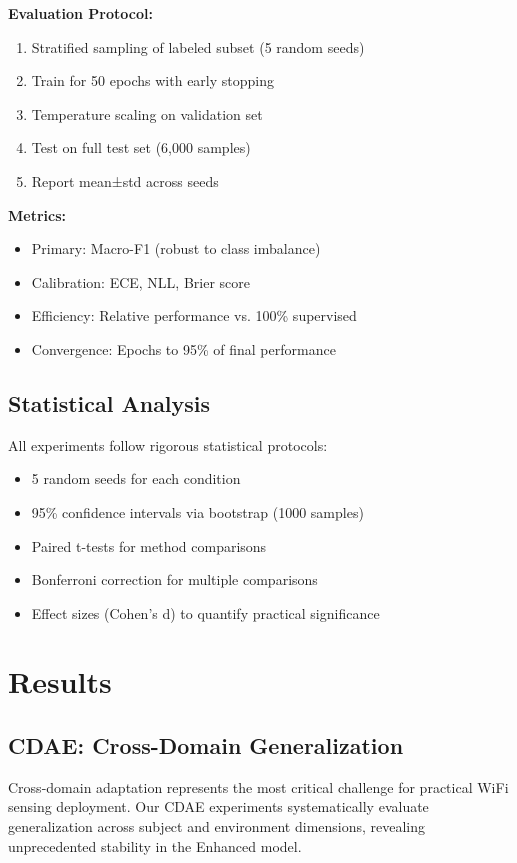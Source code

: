 \documentclass[journal]{IEEEtran}
\begin{document}
\textbf{Evaluation Protocol:}
\begin{enumerate}
\item Stratified sampling of labeled subset (5 random seeds)
\item Train for 50 epochs with early stopping
\item Temperature scaling on validation set
\item Test on full test set (6,000 samples)
\item Report mean±std across seeds
\end{enumerate}

\textbf{Metrics:}
\begin{itemize}
\item Primary: Macro-F1 (robust to class imbalance)
\item Calibration: ECE, NLL, Brier score
\item Efficiency: Relative performance vs. 100\% supervised
\item Convergence: Epochs to 95\% of final performance
\end{itemize}

\subsection{Statistical Analysis}
All experiments follow rigorous statistical protocols:
\begin{itemize}
\item 5 random seeds for each condition
\item 95\% confidence intervals via bootstrap (1000 samples)
\item Paired t-tests for method comparisons
\item Bonferroni correction for multiple comparisons
\item Effect sizes (Cohen's d) to quantify practical significance
\end{itemize}

\section{Results}
\subsection{CDAE: Cross-Domain Generalization}
Cross-domain adaptation represents the most critical challenge for practical WiFi sensing deployment. Our CDAE experiments systematically evaluate generalization across subject and environment dimensions, revealing unprecedented stability in the Enhanced model.
\end{document}
